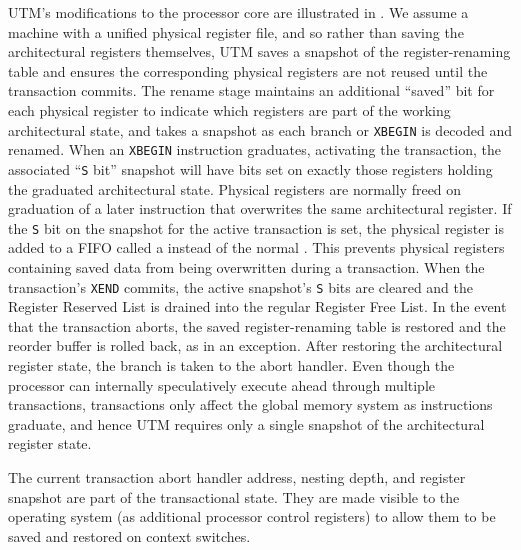 UTM's modifications to the processor core are illustrated in
.  We assume a machine with a unified physical
register file, and so rather than saving the architectural registers
themselves, UTM saves a snapshot of the register-renaming table
and ensures the corresponding physical registers are not reused until
the transaction commits.
The rename stage maintains an additional ``saved'' bit
for each physical register 
to indicate which registers are part of the working
architectural state, and takes a snapshot as
each branch or \texttt{XBEGIN} is decoded and renamed.
When an \texttt{XBEGIN} instruction
graduates, activating the transaction, the associated ``\texttt{S} bit''
snapshot will have bits set
on exactly those registers holding the graduated architectural state.  Physical
registers are normally freed on graduation of a later instruction that
overwrites the same architectural register.  If the \texttt{S} bit on
the snapshot for the active transaction is
set, the physical register is added to a FIFO called a  instead of the normal .  This
prevents physical registers containing saved data from being
overwritten during a transaction.  When the
transaction's \texttt{XEND} commits, the active snapshot's \texttt{S}
bits are cleared and the Register
Reserved List is drained into the regular Register Free List.  In the
event that the transaction aborts, the saved register-renaming table
is restored and the reorder buffer is rolled back, as in an exception.
After restoring the architectural register state, the branch is taken
to the abort handler.  Even though the processor can internally
speculatively execute ahead through multiple transactions,
transactions only affect the global memory system as instructions
graduate, and hence UTM requires only a single snapshot of the
architectural register state.


The current transaction abort handler address, nesting depth, and
register snapshot are part of the transactional state.  They are made
visible to the operating system (as additional processor control
registers) to allow them to be saved and restored on context switches.


